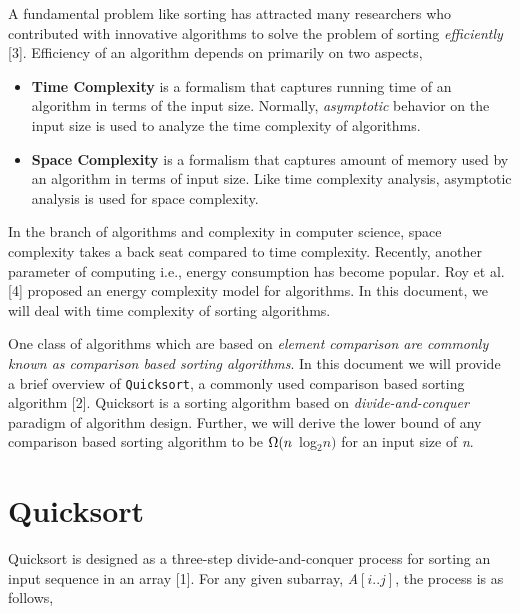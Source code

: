 \documentclass[a4paper, 10pt,twocolumn]{article}
\begin{document}
A fundamental problem like sorting has attracted many researchers who contributed with innovative algorithms to solve the problem of sorting \textit{efficiently} [3]. Efficiency of an algorithm depends on primarily on two aspects,
\begin{itemize}
    \item \textbf{Time Complexity} is a formalism that captures running time of an algorithm in terms of the input size. Normally, \textit{asymptotic} behavior on the input size is used to analyze the time complexity of algorithms.
    \item \textbf{Space Complexity} is a formalism that captures amount of memory used by an algorithm in terms of input size. Like time complexity analysis, asymptotic analysis is used for space complexity.
\end{itemize}
In the branch of algorithms and complexity in computer science, space complexity takes a back seat compared to time
complexity. Recently, another parameter of computing i.e., energy consumption has become popular. Roy et al. [4] proposed an energy complexity model for algorithms. In this document, we will deal with time complexity of sorting algorithms.

One class of algorithms which are based on \textit{element comparison are commonly known as comparison based sorting algorithms}. In this document we will provide a brief overview of \texttt{Quicksort}, a commonly used comparison based sorting algorithm
[2]. Quicksort is a sorting algorithm based on \textit{divide-and-conquer} paradigm of algorithm design. Further, we will derive the lower bound of any comparison based sorting algorithm to be $\Omega(n\hspace{.15cm}$log$_{2}n)$ for an input size of \textit{n}.


\section{Quicksort}
Quicksort is designed as a three-step divide-and-conquer process for sorting an input sequence in an array [1]. For any given subarray, \textit{A$[i..j]$}, the process is as follows,
\end{document}
